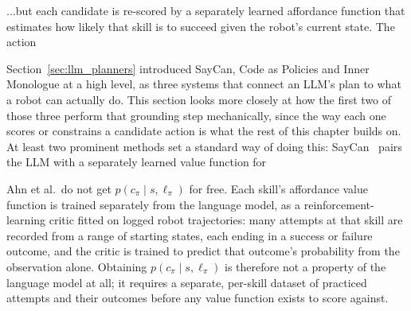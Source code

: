 
...but each candidate is re-scored by a separately learned affordance function
that estimates how likely that skill is to succeed given the robot's current state. The action


%

\label{sec:grounding}

Section~\ref{sec:llm_planners} introduced SayCan, Code as Policies and Inner Monologue at a high
level, as three systems that connect an LLM's plan to what a robot can actually do. This section
looks more closely at how the first two of those three perform that grounding step mechanically,
since the way each one scores or constrains a candidate action is what the rest of this chapter
builds on. At least two prominent methods set a standard way of doing this: SayCan~\cite{ahn2022saycan}
pairs the LLM with a separately learned value function for



Ahn et al.\ do not get $p(c_\pi \mid s, \ell_\pi)$ for free. Each skill's affordance value function
is trained separately from the language model, as a reinforcement-learning critic fitted on
logged robot trajectories: many attempts at that skill are recorded from a range of starting
states, each ending in a success or failure outcome, and the critic is trained to predict that
outcome's probability from the observation alone. Obtaining $p(c_\pi \mid s, \ell_\pi)$ is
therefore not a property of the language model at all; it requires a separate, per-skill dataset
of practiced attempts and their outcomes before any value function exists to score against.


